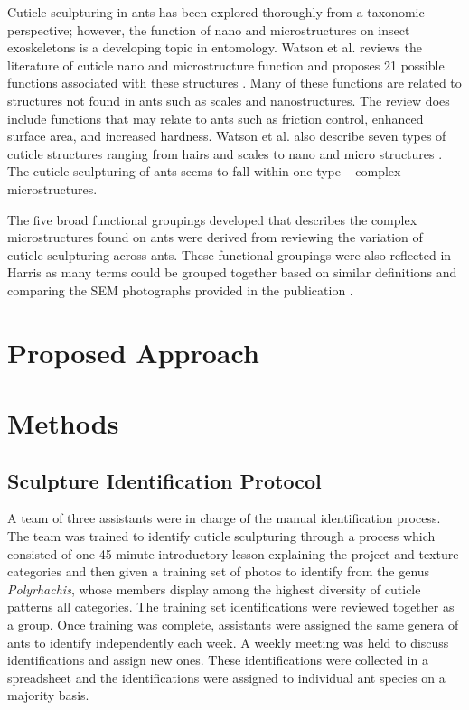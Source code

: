 \documentclass{aci}
\begin{document}
Cuticle sculpturing in ants has been explored thoroughly from a taxonomic
perspective; however, the function of nano and microstructures on insect
exoskeletons is a developing topic in entomology. Watson et al. reviews the
literature of cuticle nano and microstructure function and proposes 21 possible
functions associated with these structures \cite{watson_diversity_2017}. Many of
these functions are related to structures not found in ants such as scales and
nanostructures. The review does include functions that may relate to ants such
as friction control, enhanced surface area, and increased hardness.  Watson et
al. also describe seven types of cuticle structures ranging from hairs and
scales to nano and micro structures \cite{watson_diversity_2017}. The cuticle
sculpturing of ants seems to fall within one type – complex microstructures.

The five broad functional groupings developed that describes the complex
microstructures found on ants were derived from reviewing the variation of
cuticle sculpturing across ants. These functional groupings were also reflected
in Harris as many terms could be grouped together based on similar definitions
and comparing the SEM photographs provided in the publication
\cite{harris_glossary_1979}.


\section{Proposed Approach}

\section{Methods}

\subsection{Sculpture Identification Protocol}
A team of three assistants were in charge of the manual identification process.
The team was trained to identify cuticle sculpturing through a process which
consisted of one 45-minute introductory lesson explaining the project and
texture categories and then given a training set of photos to identify from the
genus \textit{Polyrhachis}, whose members display among the highest diversity of
cuticle patterns all categories. The training set identifications were reviewed
together as a group. Once training was complete, assistants were assigned the
same genera of ants to identify independently each week. A weekly meeting was
held to discuss identifications and assign new ones. These identifications were
collected in a spreadsheet and the identifications were assigned to individual
ant species on a majority basis.
\end{document}
